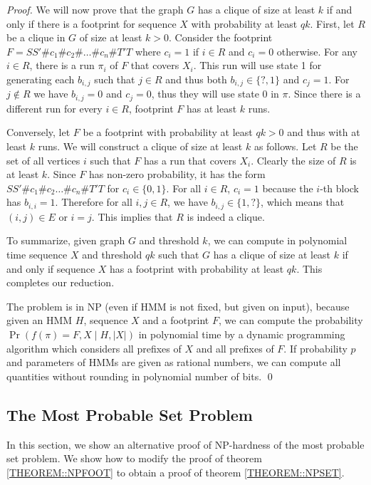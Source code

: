 \begin{proof}
We will now prove that the graph $G$ has a clique of size at least $k$
if and only if there is a footprint for sequence $X$ with
probability at least $qk$.  First, let $R$ be a clique in $G$ of size
at least $k>0$.  Consider the footprint
$F=SS'\#c_1\#c_2\#\dots\#c_n\#T'T$ where $c_i=1$ if $i\in R$ and $c_i=0$
otherwise. For any $i\in R$, there is a run $\pi_i$ of $F$ that covers
$X_i$. This run will use state 1 for generating each $b_{i,j}$ such
that $j\in R$ and thus both $b_{i,j}\in \{?,1\}$ and $c_j=1$.  For
$j\notin R$ we have $b_{i,j}=0$ and $c_j=0$, thus they will use state
0 in $\pi$. Since there is a different run for every $i\in R$, footprint 
$F$ has at least $k$ runs.



Conversely, let $F$ be a footprint with probability at least $qk>0$
and thus with at least $k$ runs. We will construct a clique of size at
least $k$ as follows. Let $R$ be the set of all vertices $i$ such that
$F$ has a run that covers $X_i$. Clearly the size of $R$ is at least
$k$.  Since $F$ has non-zero probability, it has the form
$SS'\#c_1\#c_2\dots\#c_n\#T'T$ for $c_i\in \{0,1\}$. For all $i\in R$,
$c_i=1$ because the $i$-th block has $b_{i,i}=1$. Therefore for all
$i,j\in R$, we have $b_{i,j}\in \{1,?\}$, which means that $(i,j)\in
E$ or $i=j$. This implies that $R$ is indeed a clique.

To summarize, given graph $G$ and threshold $k$, we can compute in
polynomial time sequence $X$ and threshold $qk$ such that $G$ has a
clique of size at least $k$ if and only if sequence $X$ has a
footprint with probability at least $qk$. This completes our reduction.

The problem is in NP (even if HMM is not fixed, but given on input),
because given an HMM $H$, sequence $X$ and a footprint $F$, we can
compute the probability $\Pr(f(\pi)=F,X\mid H,|X|)$ in polynomial time
by a dynamic programming algorithm which considers all prefixes of
$X$ and all prefixes of $F$. If probability $p$ and parameters of HMMs
are given as rational numbers, we can compute all quantities without
rounding in polynomial number of bits. \qed
\end{proof}

\subsection{The Most Probable Set Problem}\label{SECTION:NPSETALT}
In this section, we show an alternative proof of NP-hardness of the most
probable set problem. We show how to modify the proof of theorem \ref{THEOREM::NPFOOT}
to obtain a proof of theorem \ref{THEOREM::NPSET}.


